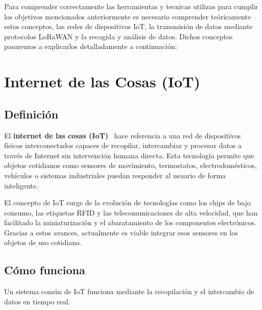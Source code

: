
Para comprender correctamente las herramientas y tecnicas utilizas para cumplir los objetivos mencionados anteriormente es necesario comprender teóricamente estos conceptos, las redes de dispositivos IoT, la transmisión de datos mediante protocolos LoRaWAN y la recogida y análisis de datos. Dichos conceptos pasaremos a explicarlos detalladamente a continuación:



\section{Internet de las Cosas (IoT)}
\subsection{Definición}
El \textbf{internet de las cosas (IoT)}~\cite{aws:iot} hace referencia a una red de dispositivos físicos interconectados capaces de recopilar, intercambiar y procesar datos a través de Internet sin intervención humana directa. Esta tecnología permite que objetos cotidianos como sensores de movimiento, termostatos, electrodomésticos, vehículos o sistemas industriales puedan responder al usuario de forma inteligente.

El concepto de IoT surge de la evolución de tecnologías como los chips de bajo consumo, las etiquetas RFID y las telecomunicaciones de alta velocidad, que han facilitado la miniaturización y el abaratamiento de los componentes electrónicos. Gracias a estos avances, actualmente es viable integrar esos sensores en los objetos de uso cotidiano.
\subsection{Cómo funciona}
Un sistema común de IoT funciona mediante la recopilación y el intercambio de datos en tiempo real. 

